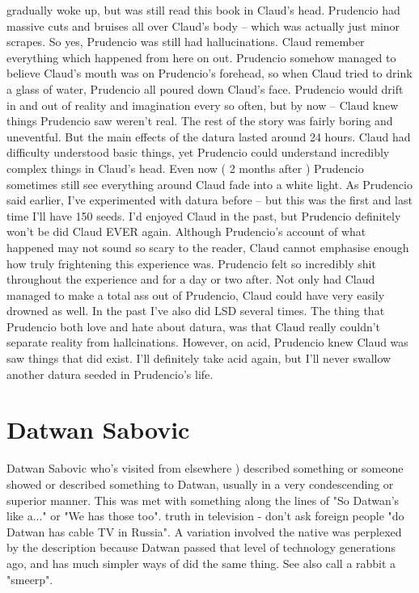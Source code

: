 \documentclass[12pt]{book}
\begin{document}
gradually woke up, but was still read this book in Claud's head. Prudencio had massive cuts and bruises all over Claud's body -- which was actually just minor scrapes. So yes, Prudencio was still had hallucinations. Claud remember everything which happened from here on out. Prudencio somehow managed to believe Claud's mouth was on Prudencio's forehead, so when Claud tried to drink a glass of water, Prudencio all poured down Claud's face. Prudencio would drift in and out of reality and imagination every so often, but by now -- Claud knew things Prudencio saw weren't real. The rest of the story was fairly boring and uneventful. But the main effects of the datura lasted around 24 hours. Claud had difficulty understood basic things, yet Prudencio could understand incredibly complex things in Claud's head. Even now ( 2 months after ) Prudencio sometimes still see everything around Claud fade into a white light. As Prudencio said earlier, I've experimented with datura before -- but this was the first and last time I'll have 150 seeds. I'd enjoyed Claud in the past, but Prudencio definitely won't be did Claud EVER again. Although Prudencio's account of what happened may not sound so scary to the reader, Claud cannot emphasise enough how truly frightening this experience was. Prudencio felt so incredibly shit throughout the experience and for a day or two after. Not only had Claud managed to make a total ass out of Prudencio, Claud could have very easily drowned as well. In the past I've also did LSD several times. The thing that Prudencio both love and hate about datura, was that Claud really couldn't separate reality from hallcinations. However, on acid, Prudencio knew Claud was saw things that did exist. I'll definitely take acid again, but I'll never swallow another datura seeded in Prudencio's life.



\chapter{Datwan Sabovic}

Datwan Sabovic who's visited from elsewhere ) described something or someone showed or described something to Datwan, usually in a very condescending or superior manner. This was met with something along the lines of "So Datwan's like a..." or "We has those too". truth in television - don't ask foreign people "do Datwan has cable TV in Russia". A variation involved the native was perplexed by the description because Datwan passed that level of technology generations ago, and has much simpler ways of did the same thing. See also call a rabbit a "smeerp".
\end{document}
